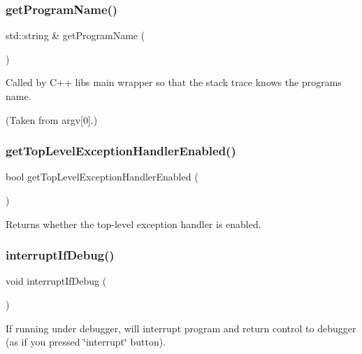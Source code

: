 \subsubsection{\texorpdfstring{get\+Program\+Name()}{getProgramName()}}
{\footnotesize\ttfamily std\+::string \& get\+Program\+Name (\begin{DoxyParamCaption}{ }\end{DoxyParamCaption})}



Called by C++ lib\textquotesingle{}s main wrapper so that the stack trace knows the program\textquotesingle{}s name. 

(Taken from argv\mbox{[}0\mbox{]}.) \mbox{\label{namespacegexceptions_a6a3658a12893a1ea2acaa6fc6e8b6d82}} 
\subsubsection{\texorpdfstring{get\+Top\+Level\+Exception\+Handler\+Enabled()}{getTopLevelExceptionHandlerEnabled()}}
{\footnotesize\ttfamily bool get\+Top\+Level\+Exception\+Handler\+Enabled (\begin{DoxyParamCaption}{ }\end{DoxyParamCaption})}



Returns whether the top-\/level exception handler is enabled. 

\mbox{\label{namespacegexceptions_ac271a27f160c64bf051b5daf6e0fe6a1}} 
\subsubsection{\texorpdfstring{interrupt\+If\+Debug()}{interruptIfDebug()}}
{\footnotesize\ttfamily void interrupt\+If\+Debug (\begin{DoxyParamCaption}{ }\end{DoxyParamCaption})}



If running under debugger, will interrupt program and return control to debugger (as if you pressed \char`\"{}interrupt\char`\"{} button). 

